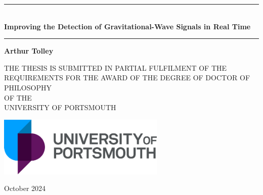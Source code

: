\begin{titlepage}
   \begin{center}

        \vspace*{1.5cm}

   
        \rule{\textwidth}{0.4pt}\\
        \vspace{0.4cm}
        \Huge \textbf{Improving the Detection of Gravitational-Wave Signals in Real Time}
        \rule{\textwidth}{0.4pt}

        \vspace{1.0cm}
        \textbf{Arthur Tolley}

        \vspace{1.0cm}
            
        {\large THE THESIS IS SUBMITTED IN PARTIAL FULFILMENT OF THE REQUIREMENTS FOR THE AWARD OF THE DEGREE OF DOCTOR OF PHILOSOPHY}\\
        {\large OF THE}\\
        {\large UNIVERSITY OF PORTSMOUTH}

        \vspace{2.0cm}
     
       \includegraphics[width=0.6\textwidth]{images/preamble/UoP_Logo.pdf}
            
        \large October 2024
            
   \end{center}
\end{titlepage}